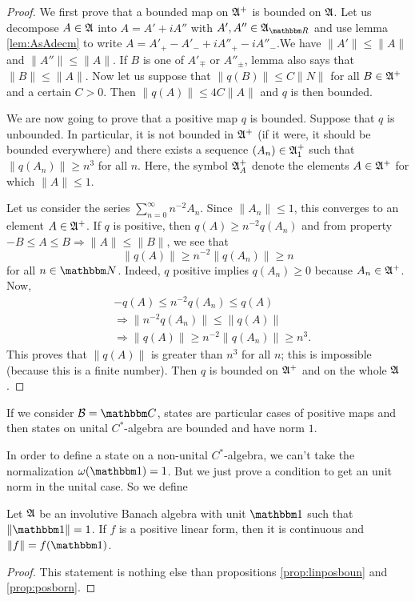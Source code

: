 \begin{proof}
We first prove that a bounded map on $\mathfrak{A}^+$ is bounded on $\mathfrak{A}$. Let us decompose $A\in\mathfrak{A}$ into $A=A'+iA''$ with $A',A''\in\cA_{\eR}$ and use lemma \ref{lem:AsAdecm} to write $A=A'_+-A'_-+iA''_+-iA''_-$.We have $\| A' \|\leq \| A \|$ and $\| A'' \|\leq \| A \|$. If $B$ is one of $A'_{\mp}$ or $A''_{\pm}$, lemma also says that $\| B \|\leq \| A \|$. Now let us suppose that $\| q(B) \| \leq C\| N \|$ for all $B\in\mathfrak{A}^+$ and a certain $C>0$. Then $\| q(A) \|\leq 4 C\| A \|$ and $q$ is then bounded.

We are now going to prove that a positive map $q$ is bounded. Suppose that $q$ is unbounded. In particular, it is not bounded in $\mathfrak{A}^+$ (if it were, it should be bounded everywhere) and there exists a sequence $(A_n)\in\mathfrak{A}^+_1$ such that $\| q(A_n) \|\geq n^3$ for all $n$. Here, the symbol $\mathfrak{A}_A^+$ denote the elements $A\in\mathfrak{A}^+$ for which $\| A \|\leq 1$.

Let us consider the series $\sum_{n=0}^{\infty}n^{-2}A_n$. Since $\| A_n \|\leq 1$, this converges to an element $A\in\mathfrak{A}^+$. If $q$ is positive, then $q(A)\geq n^{-2}q(A_n)$ and from property $-B\leq A\leq B\Rightarrow\| A \|\leq\| B \|$, we see that
\[ 
 \| q(A) \|\geq n^{-2}\| q(A_n) \|\geq n 
\]
for all $n\in\eN$. Indeed, $q$ positive implies $q(A_n)\geq 0$ because $A_n\in\mathfrak{A}^+$. Now,
\begin{equation}
\begin{split}
&-q(A)\leq n^{-2}q(A_n)\leq q(A)\\
&\Rightarrow \| n^{-2}q(A_n) \|\leq\| q(A) \|\\
&\Rightarrow \| q(A) \|\geq n^{-2}\| q(A_n) \|\geq n^3.
\end{split}
\end{equation}
This proves that $\| q(A) \|$ is greater than $n^3$ for all $n$; this is impossible (because this is a finite number). Then $q$ is bounded on $\mathfrak{A}^+$ and on the whole $\mathfrak{A}$.

\end{proof}

If we consider $\cB=\eC$, states are particular cases of positive maps and then states on unital $C^*$-algebra are bounded and have norm $1$. 

In order to define a state on a non-unital $C^*$-algebra, we can't take the normalization $\omega(\cun)=1$. But we just prove a condition to get an unit norm in the unital case. So we define


\begin{proposition}
Let $\mathfrak{A}$ be an involutive Banach algebra with unit $\cun$ such that $\| \cun \|=1$. If $f$ is a positive linear form, then it is continuous and $\| f \|=f(\cun)$. \label{prop_Dix214}
\end{proposition}
\begin{proof}
This statement is nothing else than propositions \ref{prop:linposboun} and \ref{prop:posborn}.
\end{proof}


